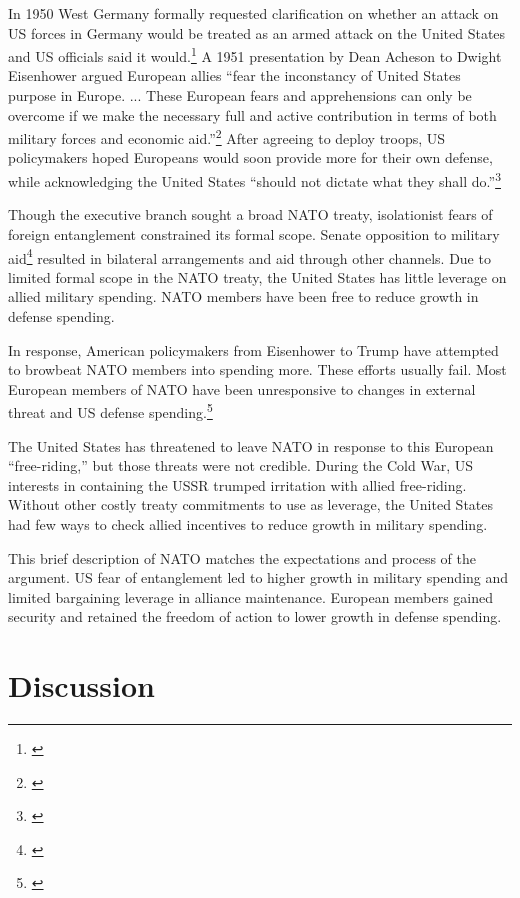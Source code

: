 \documentclass[12pt]{article}
\begin{document}
In 1950 West Germany formally requested clarification on whether an attack on US forces in Germany would be treated as an armed attack on the United States and US officials said it would.\footnote{\citep[pg. 395]{Acheson1969}} 
A 1951 presentation by Dean Acheson to Dwight Eisenhower argued European allies ``fear the inconstancy of United States purpose in Europe. ... These European fears and apprehensions can only be overcome if we make the necessary full and active contribution in terms of both military forces and economic aid.''\footnote{\citep[pg. 3]{Acheson1951}}
After agreeing to deploy troops, US policymakers hoped Europeans would soon provide more for their own defense, while acknowledging the United States ``should not dictate what they shall do.''\footnote{\citep[pg. 2]{Johnson1950}} 


Though the executive branch sought a broad NATO treaty, isolationist fears of foreign entanglement constrained its formal scope. 
Senate opposition to military aid\footnote{\citep[pg 285]{Acheson1969}} resulted in bilateral arrangements and aid through other channels. 
Due to limited formal scope in the NATO treaty, the United States has little leverage on allied military spending. 
NATO members have been free to reduce growth in defense spending. 


In response, American policymakers from Eisenhower to Trump have attempted to browbeat NATO members into spending more. 
These efforts usually fail. 
Most European members of NATO have been unresponsive to changes in external threat and US defense spending.\footnote{\citep{PluemperNeumayer2015}} 


The United States has threatened to leave NATO in response to this European ``free-riding,'' but those threats were not credible. 
During the Cold War, US interests in containing the USSR trumped irritation with allied free-riding.  
Without other costly treaty commitments to use as leverage, the United States had few ways to check allied incentives to reduce growth in military spending. 


This brief description of NATO matches the expectations and process of the argument. 
US fear of entanglement led to higher growth in military spending and limited bargaining leverage in alliance maintenance. 
European members gained security and retained the freedom of action to lower growth in defense spending.   


\section{Discussion}
\end{document}
